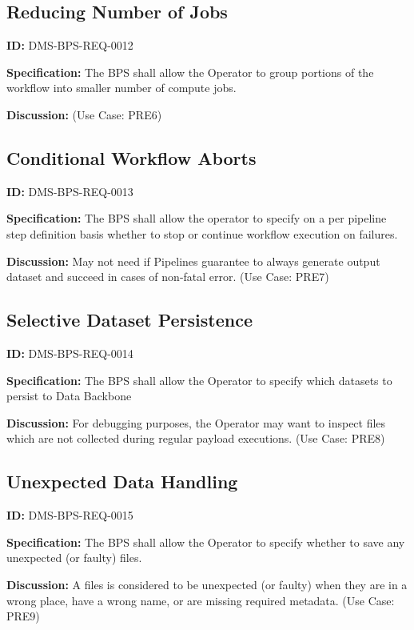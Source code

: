 \documentclass[SE,toc,lsstdraft]{lsstdoc}
\begin{document}
\subsection{Reducing Number of Jobs}

\label{DMS-BPS-REQ-0012}
\textbf{ID:} DMS-BPS-REQ-0012

\textbf{Specification:}
The BPS shall allow the Operator to group portions of the workflow into smaller number of compute jobs.

\textbf{Discussion:}
(Use Case: PRE6)

\subsection{Conditional Workflow Aborts}

\label{DMS-BPS-REQ-0013}
\textbf{ID:} DMS-BPS-REQ-0013

\textbf{Specification:}
The BPS shall allow the operator to specify on a per pipeline step definition basis whether to stop or continue workflow execution on failures.

\textbf{Discussion:}
May not need if Pipelines guarantee to always generate output dataset and succeed in cases of non-fatal error.  (Use Case: PRE7)

\subsection{Selective Dataset Persistence}

\label{DMS-BPS-REQ-0014}
\textbf{ID:} DMS-BPS-REQ-0014

\textbf{Specification:}
The BPS shall allow the Operator to specify which datasets to persist to Data Backbone

\textbf{Discussion:}
For debugging purposes, the Operator may want to inspect files which are not collected during regular payload executions.  (Use Case: PRE8)

\subsection{Unexpected Data Handling}

\label{DMS-BPS-REQ-0015}
\textbf{ID:} DMS-BPS-REQ-0015

\textbf{Specification:}
The BPS shall allow the Operator to specify whether to save any unexpected (or faulty) files.

\textbf{Discussion:}
A files is considered to be unexpected (or faulty) when they are in a wrong place, have a wrong name, or are missing required metadata.  (Use Case: PRE9)
\end{document}
